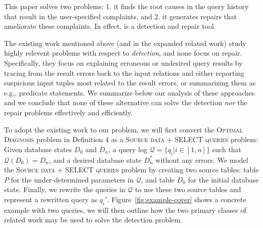 This paper solves two problems: 1. it finds the root causes in the
query history that result in the user-specified complaints, and 2. it generates repairs 
that ameliorate these complaints.  In effect, \sys is a detection and repair tool.  

The existing work mentioned above (and in the expanded related work) study highly relevent problems with respect to {\it detection}, and none focus on repair.
Specifically, they focus on explaining erroneous or undesired query results by tracing from the result errors back to the input relations and either reporting suspicious input tuples most related to the result errors, or summarizing them as e.g., predicate statements.
We summarize below our analysis of these approaches and we conclude that none of these alternative can solve the detection {\it nor} the repair problems effectively and efficiently.

To adopt the existing work to our problem, we will first convert the
\textsc{Optimal Diagnosis} problem in Definition 4 as a \textsc{Source data +
SELECT queries} problem: Given database states $D_0$ and $D_n$, a query log
$\mathcal{Q} = \{q_i | i \in [1, n]\}$ such that $\mathcal{Q}(D_0) = D_n$, and a desired
database state $D_n^*$ without any errors.
We model the \textsc{Source data + SELECT queries} problem by creating two source tables: 
table $P$ for the under-determined parameters in $\mathcal{Q}$, and table $D_0$ for the initial database state.
Finally, we rewrite the queries in $\mathcal{Q}$ to use these two source tables and represent a rewritten query as $q_i'$.
Figure~\ref{fig:example-cover} shows a concrete example with two queries, we will then outline how the two primary classes 
of related work may be used to solve the detection problem.


